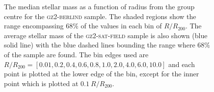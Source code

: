 \documentclass[useAMS,usenatbib]{mn2e}
\begin{document}
\begin{figure}
\caption[Average mass with group radius in the \textsc{gz2-berlind} sample]{The median stellar mass as a function of radius from the group centre for the \textsc{gz2-berlind} sample. The shaded regions show the range encompassing $68\%$ of the values in each bin of $R/R_{200}$. The average stellar mass of the \textsc{gz2-sat-field} sample is also shown (blue solid line) with the blue dashed lines bounding the range where $68\%$ of the sample are found. The bin edges used are $R/R_{200} =  [0.01 ,   0.2,   0.4,   0.6,   0.8,   1.0 ,   2.0 ,   4.0 ,   6.0 ,  10.0]$ and each point is plotted at the lower edge of the bin, except for the inner point which is plotted at $0.1~R/R_{200}$.}
\label{fig:massdep}
\end{figure}
\end{document}
